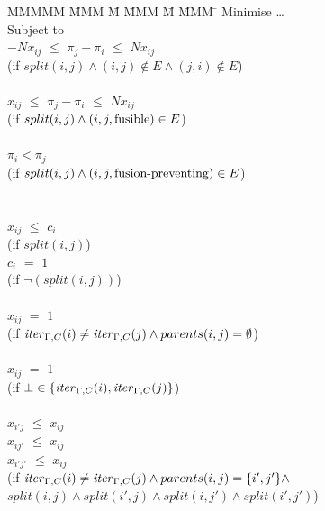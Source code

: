 \begin{figure}[H]
\begin{tabbing}
MMMMM   \= MMM \= M \= MMM \= M \= MMM \= \kill
Minimise   \> \ldots \\
Subject to \\
           \> $-N x_{ij}$ \> $\le$ \> $\pi_j - \pi_i$ \> $\le$ \> $N x_{ij}$ \\
           \> (if $split(i,j) \wedge (i,j) \not\in E \wedge (j,i) \not\in E$)            \\
\\
           \>    $x_{ij}$ \> $\le$ \> $\pi_j - \pi_i$ \> $\le$ \> $N x_{ij}$ \\
           \> (if $split(i,j) \wedge (i,j,\mathrm{fusible}) \in E$)     \\
\\
           \>             \>       \> $\pi_i < \pi_j$ \>       \>            \\
           \> (if $split(i,j) \wedge (i,j,\mbox{fusion-preventing}) \in E$)    \\
\\
\\
           \> $x_{ij}$    \> $\le$ \> $c_i$           \>       \>            \\
           \> (if $split(i,j)$) \\
           \> $c_{i }$    \> $ = $ \> $ 1 $           \>       \>            \\
           \> (if $\neg(split(i,j))$) \\
\\
           \> $x_{ij}$    \> $=$   \> $1$             \>       \>            \\
           \> (if $\mathit{iter}_{\Gamma,C}(i) \not= \mathit{iter}_{\Gamma,C}(j) \wedge parents(i,j) = \emptyset$)  \\
           \\
           \> $x_{ij}$    \> $=$   \> $1$             \>       \>            \\
           \> (if $\bot \in \{\mathit{iter}_{\Gamma,C}(i), \mathit{iter}_{\Gamma,C}(j)\}$)  \\
           \\
           \> $x_{i'j}$   \> $\le$ \> $x_{ij}$        \>       \>            \\
           \> $x_{ij'}$   \> $\le$ \> $x_{ij}$        \>       \>            \\
           \> $x_{i'j'}$   \> $\le$ \> $x_{ij}$        \>       \>            \\
           \> (if $\mathit{iter}_{\Gamma,C}(i) \not= \mathit{iter}_{\Gamma,C}(j) \wedge parents(i,j) = \{i',j'\} \wedge$ \\

           \> \> $ split(i,j) \wedge split(i',j) \wedge split(i,j') \wedge split(i',j') $) \\
\end{tabbing}
\end{figure}

% 
